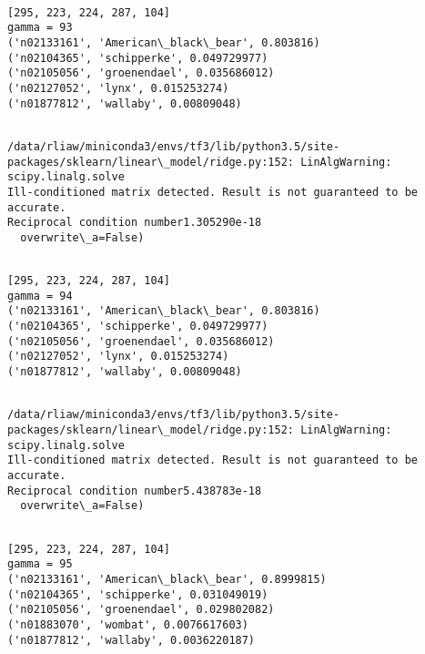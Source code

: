 \documentclass[11pt]{article}
\begin{document}
    \begin{Verbatim}[commandchars=\\\{\}]

[295, 223, 224, 287, 104]
gamma = 93
('n02133161', 'American\_black\_bear', 0.803816)
('n02104365', 'schipperke', 0.049729977)
('n02105056', 'groenendael', 0.035686012)
('n02127052', 'lynx', 0.015253274)
('n01877812', 'wallaby', 0.00809048)


    \end{Verbatim}

    \begin{Verbatim}[commandchars=\\\{\}]
/data/rliaw/miniconda3/envs/tf3/lib/python3.5/site-packages/sklearn/linear\_model/ridge.py:152: LinAlgWarning: scipy.linalg.solve
Ill-conditioned matrix detected. Result is not guaranteed to be accurate.
Reciprocal condition number1.305290e-18
  overwrite\_a=False)

    \end{Verbatim}

    \begin{Verbatim}[commandchars=\\\{\}]

[295, 223, 224, 287, 104]
gamma = 94
('n02133161', 'American\_black\_bear', 0.803816)
('n02104365', 'schipperke', 0.049729977)
('n02105056', 'groenendael', 0.035686012)
('n02127052', 'lynx', 0.015253274)
('n01877812', 'wallaby', 0.00809048)


    \end{Verbatim}

    \begin{Verbatim}[commandchars=\\\{\}]
/data/rliaw/miniconda3/envs/tf3/lib/python3.5/site-packages/sklearn/linear\_model/ridge.py:152: LinAlgWarning: scipy.linalg.solve
Ill-conditioned matrix detected. Result is not guaranteed to be accurate.
Reciprocal condition number5.438783e-18
  overwrite\_a=False)

    \end{Verbatim}

    \begin{Verbatim}[commandchars=\\\{\}]

[295, 223, 224, 287, 104]
gamma = 95
('n02133161', 'American\_black\_bear', 0.8999815)
('n02104365', 'schipperke', 0.031049019)
('n02105056', 'groenendael', 0.029802082)
('n01883070', 'wombat', 0.0076617603)
('n01877812', 'wallaby', 0.0036220187)


    \end{Verbatim}
\end{document}
